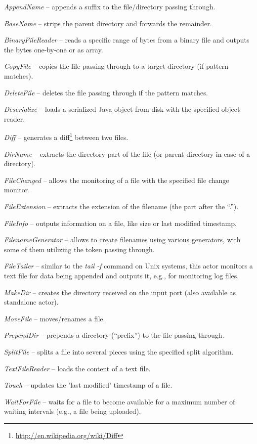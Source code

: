 \begin{tight_itemize}
	\item \textit{AppendName} -- appends a suffix to the file/directory passing
	through.
	\item \textit{BaseName} -- strips the parent directory and forwards the
	remainder.
	\item \textit{BinaryFileReader} -- reads a specific range of bytes from 
	a binary file and outputs the bytes one-by-one or as array.
	\item \textit{CopyFile} -- copies the file passing through to a target
	directory (if pattern matches).
	\item \textit{DeleteFile} -- deletes the file passing through if the pattern
	matches.
	\item \textit{Deserialize} -- loads a serialized Java object from disk with
	the specified object reader.
	\item \textit{Diff} -- generates a diff\footnote{\url{http://en.wikipedia.org/wiki/Diff}{}} 
	between two files.
	\item \textit{DirName} -- extracts the directory part of the file (or parent
	directory in case of a directory).
	\item \textit{FileChanged} -- allows the monitoring of a file with
	the specified file change monitor.
	\item \textit{FileExtension} -- extracts the extension of the filename (the
	part after the ``.'').
	\item \textit{FileInfo} -- outputs information on a file, like size or last
	modified timestamp.
	\item \textit{FilenameGenerator} -- allows to create filenames using various
	generators, with some of them utilizing the token passing through.
	\item \textit{FileTailer} -- similar to the \textit{tail -f} command on
	Unix systems, this actor monitors a text file for data being appended and
	outputs it, e.g., for monitoring log files.
	\item \textit{MakeDir} -- creates the directory received on the input port
	(also available as standalone actor).
	\item \textit{MoveFile} -- moves/renames a file.
	\item \textit{PrependDir} -- prepends a directory (``prefix'') to the file
	passing through.
	\item \textit{SplitFile} -- splits a file into several pieces using the 
	specified split algorithm.
	\item \textit{TextFileReader} -- loads the content of a text file.
	\item \textit{Touch} -- updates the 'last modified' timestamp of a file.
	\item \textit{WaitForFile} -- waits for a file to become available for
	a maximum number of waiting intervals (e.g., a file being uploaded).
\end{tight_itemize}
